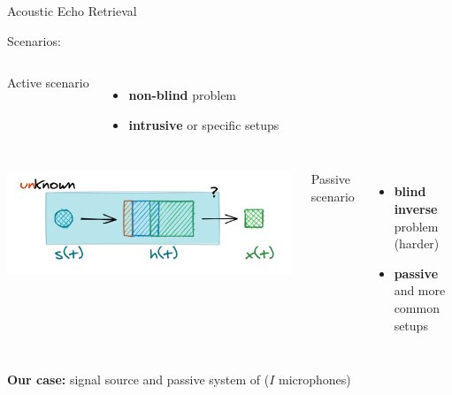 \begin{frame}[t]{Acoustic Echo Retrieval \hfill\faBook}
\begin{block}{Scenarios:}
\begin{columns}[onlytextwidth]
        Active scenario
        \begin{itemize}
            \small
            \item[\faEye] \textbf{non-blind} problem
            \item[\faVolumeUp] \textbf{intrusive} or specific setups
            \\
        \end{itemize}
    \end{columns}
    \end{block}

    \begin{mycontriblock}
        \begin{columns}[onlytextwidth]

        \centering
        \includegraphics[width=.9\textwidth]{./figures/passive.png}

        Passive scenario
        \begin{itemize}
            \small
            \item[\faEyeSlash] \textbf{blind inverse} problem (harder)
            \item[\faMicrophone] \textbf{passive} and more common setups
            \\
        \end{itemize}
    \end{columns}
    \end{mycontriblock}

    \begin{center}
        \textcolor{myred}{\textbf{Our case:} signal source and passive system of ($I$ microphones)}
    \end{center}

\end{frame}

